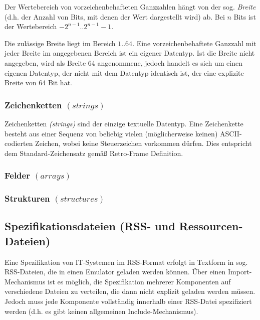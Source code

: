 \documentclass{scrartcl}
\begin{document}
\vspace{10pt}
\noindent Der Wertebereich von vorzeichenbehafteten Ganzzahlen hängt von der sog. \textit{Breite} (d.h. der Anzahl von Bits, mit denen der Wert dargestellt wird) ab. Bei $n$ Bits ist der Wertebereich $-2^{n-1}..2^{n-1} - 1$.

\vspace{10pt}
\noindent Die zulässige Breite liegt im Bereich $1..64$. Eine vorzeichenbehaftete Ganzzahl mit jeder Breite im angegebenen Bereich ist ein eigener Datentyp. Ist die Breite nicht angegeben, wird als Breite $64$ angenommene, jedoch handelt es sich um einen eigenen Datentyp, der nicht mit dem Datentyp identisch ist, der eine explizite Breite von 64 Bit hat.

\subsubsection{Zeichenketten $(strings)$}

\noindent Zeichenketten \textit{(strings)} sind der einzige textuelle Datentyp. Eine Zeichenkette besteht aus einer Sequenz von beliebig vielen (möglicherweise keinen) ASCII-codierten Zeichen, wobei keine Steuerzeichen vorkommen dürfen. Dies entspricht dem Standard-Zeichensatz gemäß Retro-Frame Definition.

\subsubsection{Felder $(arrays)$}

\subsubsection{Strukturen $(structures)$}

\subsection{Spezifikationsdateien (RSS- und Ressourcen-Dateien)}

\noindent Eine Spezifikation von IT-Systemen im RSS-Format erfolgt in Textform in sog. RSS-Dateien, die in einen Emulator geladen werden können. Über einen Import-Mechanismus ist es möglich, die Spezifikation mehrerer Komponenten auf verschiedene Dateien zu verteilen, die dann nicht explizit geladen werden müssen. Jedoch muss jede Komponente vollständig innerhalb einer RSS-Datei spezifiziert werden (d.h. es gibt keinen allgemeinen Include-Mechanismus).
\end{document}
